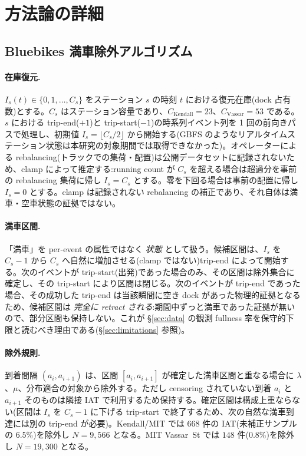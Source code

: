 
\section{方法論の詳細}\label{app:methods}

\subsection{Bluebikes 満車除外アルゴリズム}\label{app:fullness}

\paragraph{在庫復元.} $I_s(t) \in \{0, 1, \dots, C_s\}$ をステーション $s$ の時刻 $t$ における復元在庫(dock 占有数)とする。$C_s$ はステーション容量であり、$C_{\text{Kendall}} = 23$、$C_{\text{Vassar}} = 53$ である。$s$ における trip-end($+1$)と trip-start($-1$)の時系列イベント列を 1 回の前向きパスで処理し、初期値 $I_s = \lfloor C_s/2 \rfloor$ から開始する(GBFS のようなリアルタイムステーション状態は本研究の対象期間では取得できなかった)。オペレーターによる rebalancing(トラックでの集荷・配置)は公開データセットに記録されないため、clamp によって推定する:running count が $C_s$ を超える場合は超過分を事前の rebalancing 集荷に帰し $I_s = C_s$ とする。零を下回る場合は事前の配置に帰し $I_s = 0$ とする。clamp は記録されない rebalancing の補正であり、それ自体は満車・空車状態の証拠ではない。

\paragraph{満車区間.} 「満車」を per-event の属性ではなく \emph{状態} として扱う。候補区間は、$I_s$ を $C_s - 1$ から $C_s$ へ自然に増加させる(clamp ではない)trip-end によって開始する。次のイベントが trip-start(出発)であった場合のみ、その区間は除外集合に確定し、その trip-start により区間は閉じる。次のイベントが trip-end であった場合、その成功した trip-end は当該瞬間に空き dock があった物理的証拠となるため、候補区間は \emph{完全に retract される}:期間中ずっと満車であった証拠が無いので、部分区間も保持しない。これが \S\ref{sec:data} の観測 fullness 率を保守的下限と読むべき理由である(\S\ref{sec:limitations} 参照)。

\paragraph{除外規則.} 到着間隔 $(a_i, a_{i+1})$ は、区間 $[a_i, a_{i+1}]$ が確定した満車区間と重なる場合に $\lambda$、$\mu$、分布適合の対象から除外する。ただし censoring されていない到着 $a_i$ と $a_{i+1}$ そのものは隣接 IAT で利用するため保持する。確定区間は構成上重ならない(区間は $I_s$ を $C_s-1$ に下げる trip-start で終了するため、次の自然な満車到達には別の trip-end が必要)。Kendall/MIT では $668$ 件の IAT(未補正サンプルの $6.5\%$)を除外し $N = 9{,}566$ となる。MIT Vassar~St では $148$ 件($0.8\%$)を除外し $N = 19{,}300$ となる。


